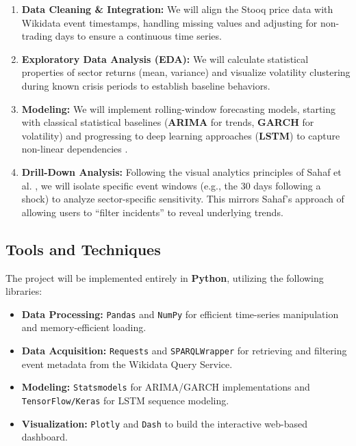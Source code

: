 \documentclass{article}
\begin{document}
\begin{enumerate}
    \item \textbf{Data Cleaning \& Integration:} We will align the Stooq price data with Wikidata event timestamps, handling missing values and adjusting for non-trading days to ensure a continuous time series.
    
    \item \textbf{Exploratory Data Analysis (EDA):} We will calculate statistical properties of sector returns (mean, variance) and visualize volatility clustering during known crisis periods to establish baseline behaviors.
    
    \item \textbf{Modeling:} We will implement rolling-window forecasting models, starting with classical statistical baselines (\textbf{ARIMA} for trends, \textbf{GARCH} for volatility) and progressing to deep learning approaches (\textbf{LSTM}) to capture non-linear dependencies \cite{syllabus}.
    
    \item \textbf{Drill-Down Analysis:} Following the visual analytics principles of Sahaf et al. \cite{sahaf2017}, we will isolate specific event windows (e.g., the 30 days following a shock) to analyze sector-specific sensitivity. This mirrors Sahaf's approach of allowing users to ``filter incidents'' to reveal underlying trends.
\end{enumerate}

\subsection{Tools and Techniques}
The project will be implemented entirely in \textbf{Python}, utilizing the following libraries:
\begin{itemize}
    \item \textbf{Data Processing:} \texttt{Pandas} and \texttt{NumPy} for efficient time-series manipulation and memory-efficient loading.
    \item \textbf{Data Acquisition:} \texttt{Requests} and \texttt{SPARQLWrapper} for retrieving and filtering event metadata from the Wikidata Query Service.
    \item \textbf{Modeling:} \texttt{Statsmodels} for ARIMA/GARCH implementations and \texttt{TensorFlow/Keras} for LSTM sequence modeling.
    \item \textbf{Visualization:} \texttt{Plotly} and \texttt{Dash} to build the interactive web-based dashboard.
\end{itemize}
\end{document}
